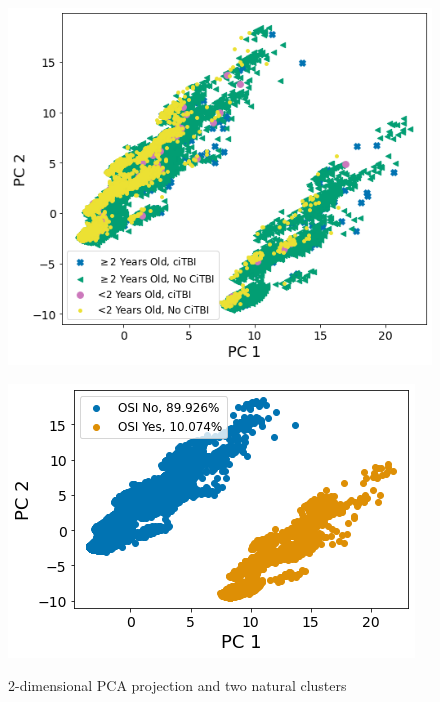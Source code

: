 \documentclass[11pt, letterpaper]{amsart}
\begin{document}
\begin{figure}
	\begin{minipage}[b]{0.5\linewidth}
		\centering
		\includegraphics[width=\textwidth]{pca_age_outcome.png}
		\label{fig:pca_age_outcome}
	\end{minipage}%
	\begin{minipage}[b]{0.5\linewidth}
		\centering
		\includegraphics[width=\textwidth]{pca_osi.png}
		\label{fig:pca_osi}
	\end{minipage}
	\caption{2-dimensional PCA projection and two natural clusters}\label{fig:pca}
\end{figure}
\end{document}
